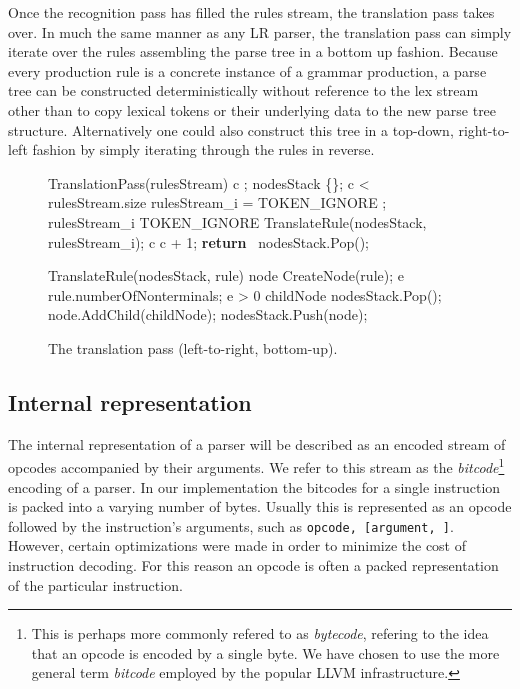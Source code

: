 \documentclass[envcountsame,runningheads]{llncs}
\begin{document}
Once the recognition pass has filled the rules stream, the translation pass takes over. 
In much the same manner as any LR parser, the translation pass can simply iterate over the rules assembling the parse tree in a bottom up fashion. 
Because every production rule is a concrete instance of a grammar production, a parse tree can be constructed deterministically without reference to the lex stream 
other than to copy lexical tokens or their underlying data to the new parse tree structure.
Alternatively one could also construct this tree in a top-down, right-to-left fashion by simply iterating through the rules in reverse.
\begin{figure}[!ht]
\centering
\begin{gcl}
\PROC TranslationPass(rulesStream)
  c ;
  nodesStack \becomes \{\};
  \DO c < rulesStream.size \rightarrow
    \IF rulesStream_i = TOKEN\_IGNORE \rightarrow
    \quad \SKIP;
    \BAR rulesStream_i \neq TOKEN\_IGNORE \rightarrow
    \quad TranslateRule(nodesStack, rulesStream_i);
    \FI
    c \becomes c + 1;
  \OD
  \textbf{return} \ nodesStack.Pop();
\CORP

\PROC Translate\!Rule(nodesStack, rule)
  node \becomes CreateN\!ode(rule);
  e \becomes rule.numberO\!f\!Nonterminals;
  \DO e > 0 \rightarrow
  \quad childNode \becomes nodesStack.Pop();
  \quad node.AddChild(childNode);
  \OD
  nodesStack.Push(node);
\CORP
\end{gcl}

\vspace{-2.5\baselineskip}
\caption{The translation pass (left-to-right, bottom-up).}
\end{figure}

\subsection{Internal representation}
The internal representation of a parser will be described as an encoded stream of opcodes accompanied by their arguments. 
We refer to this stream as the \emph{bitcode}\footnote{This is perhaps more commonly refered to as \emph{bytecode}, refering to the idea that an opcode is encoded by a single byte. We have chosen to use the more general term \emph{bitcode} employed by the popular LLVM infrastructure.} encoding of a parser.
In our implementation the bitcodes for a single instruction is packed into a varying number of bytes.
Usually this is represented as an opcode followed by the instruction's arguments, such as \texttt{opcode, [argument, \textellipsis]}.
However, certain optimizations were made in order to minimize the cost of instruction decoding. 
For this reason an opcode is often a packed representation of the particular instruction.
\end{document}
